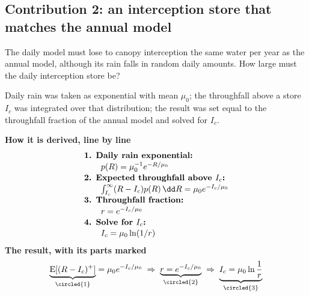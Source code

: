 \begin{pins}
\end{pins}

\subsection{Contribution 2: an interception store that matches the annual model}
\begin{problem}
The daily model must lose to canopy interception the same water per year as the annual model, although its rain falls in random daily amounts. How large must the daily interception store be?
\end{problem}
\begin{derivation}
Daily rain was taken as exponential with mean $\mu_0$; the throughfall above a store $I_c$ was integrated over that distribution; the result was set equal to the throughfall fraction of the annual model and solved for $I_c$.
\end{derivation}
\begin{keyresult}
\begin{pencil}
{\small\noindent\textbf{How it is derived, line by line}
\[\begin{array}{@{}l@{}}\textbf{1. Daily rain exponential:}\\[1pt]
\qquad p(R)=\mu_0^{-1}e^{-R/\mu_0}\\[1pt]
\textbf{2. Expected throughfall above } I_c\textbf{:}\\[1pt]
\qquad \textstyle\int_{I_c}^\infty(R-I_c)p(R)\,\dd R=\mu_0e^{-I_c/\mu_0}\\[1pt]
\textbf{3. Throughfall fraction:}\\[1pt]
\qquad r=e^{-I_c/\mu_0}\\[1pt]
\textbf{4. Solve for } I_c\textbf{:}\\[1pt]
\qquad I_c=\mu_0\ln(1/r)
\end{array}\]}
\noindent\textbf{The result, with its parts marked}
\[\underbrace{\mathrm E[(R-I_c)^+]}_{\circled{1}}=\mu_0e^{-I_c/\mu_0}\;\Rightarrow\;\underbrace{r=e^{-I_c/\mu_0}}_{\circled{2}}\;\Rightarrow\;\underbrace{I_c=\mu_0\ln\frac1r}_{\circled{3}}\]
\end{pencil}
\end{keyresult}
